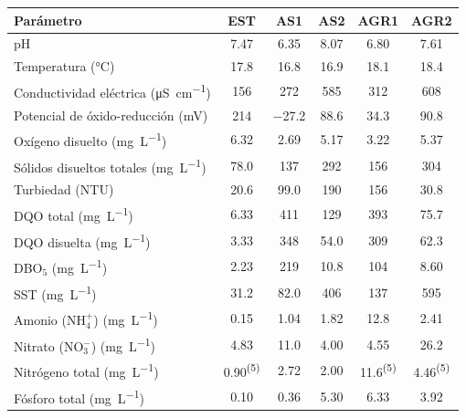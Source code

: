 \begin{tabular}{@{}>{\raggedright\arraybackslash}p{5.2cm}ccccc@{}}
  \toprule
  Parámetro & EST & AS1 & AS2 & AGR1 & AGR2 \\
  \midrule
  pH & \num{7.47} & \num{6.35} & \num{8.07} & \num{6.80} & \num{7.61} \\
  Temperatura (\unit{\degreeCelsius}) & \num{17.8} & \num{16.8} & \num{16.9} & \num{18.1} & \num{18.4} \\
  Conductividad eléctrica (\unit{\micro\siemens\per\centi\meter}) & \num{156} & \num{272} & \num{585} & \num{312} & \num{608} \\
  Potencial de óxido-reducción (\unit{\milli\volt}) & \num{214} & \num{-27.2} & \num{88.6} & \num{34.3} & \num{90.8} \\
  Oxígeno disuelto (\unit{\milli\gram\per\liter}) & \num{6.32} & \num{2.69} & \num{5.17} & \num{3.22} & \num{5.37} \\
  Sólidos disueltos totales (\unit{\milli\gram\per\liter}) & \num{78.0} & \num{137} & \num{292} & \num{156} & \num{304} \\
  Turbiedad (NTU) & \num{20.6} & \num{99.0} & \num{190} & \num{156} & \num{30.8} \\
  DQO total (\unit{\milli\gram\per\liter}) & \num{6.33} & \num{411} & \num{129} & \num{393} & \num{75.7} \\
  DQO disuelta (\unit{\milli\gram\per\liter}) & \num{3.33} & \num{348} & \num{54.0} & \num{309} & \num{62.3} \\
  DBO$_5$ (\unit{\milli\gram\per\liter}) & \num{2.23} & \num{219} & \num{10.8} & \num{104} & \num{8.60} \\
  SST (\unit{\milli\gram\per\liter}) & \num{31.2} & \num{82.0} & \num{406} & \num{137} & \num{595} \\
  Amonio (NH$_4^+$) (\unit{\milli\gram\per\liter}) & \num{0.15} & \num{1.04} & \num{1.82} & \num{12.8} & \num{2.41} \\
  Nitrato (NO$_3^-$) (\unit{\milli\gram\per\liter}) & \num{4.83} & \num{11.0} & \num{4.00} & \num{4.55} & \num{26.2} \\
  Nitrógeno total (\unit{\milli\gram\per\liter}) & \num{0.90}\textsuperscript{(5)} & \num{2.72} & \num{2.00} & \num{11.6}\textsuperscript{(5)} & \num{4.46}\textsuperscript{(5)} \\
  Fósforo total (\unit{\milli\gram\per\liter}) & \num{0.10} & \num{0.36} & \num{5.30} & \num{6.33} & \num{3.92} \\

\end{tabular}
